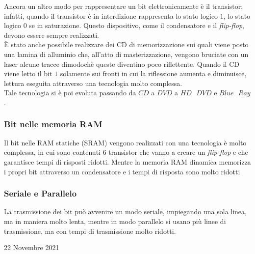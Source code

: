 \documentclass[a4paper]{extarticle}
\begin{document}
Ancora un altro modo per rappresentare un bit elettronicamente è il transistor; infatti, quando il transistor è in interdizione rappresenta lo stato logico \(1\), lo stato logico \(0\) se in saturazione. Questo dispositivo, come il condensatore e il \textit{flip-flop}, devono essere sempre realizzati.\\
È stato anche possibile realizzare dei CD di memorizzazione sui quali viene posto una lamina di alluminio che, all'atto di masterizzazione, vengono bruciate con un laser alcune tracce dimodochè queste diventino poco riflettente. Quando il CD viene letto il bit \(1\) solamente sui fronti in cui la riflessione aumenta e diminuisce, lettura eseguita attraverso una tecnologia molto complessa.\\
Tale tecnologia si è poi evoluta passando da \(CD\) a \(DVD\) a \(HD \textbf{ } DVD\) e \(Blue \textbf{ } Ray\).

\subsubsection{Bit nelle memoria RAM}
Il bit nelle RAM statiche (SRAM) vengono realizzati con una tecnologia è molto complessa, in cui sono contenuti \(6\) transistor che vanno a creare un \textit{flip-flop} e che garantisce tempi di risposti ridotti. Mentre la memoria RAM dinamica memorizza i propri bit attraverso un condensatore e i tempi di risposta sono molto ridotti

\subsubsection{Seriale e Parallelo}
La trasmissione dei bit può avvenire un modo seriale, impiegando una sola linea, ma in maniera molto lenta, mentre in modo parallelo si usano più linee di trasmissione, ma con tempi di trasmissione molto ridotti.

\newpage
\begin{center}
    22 Novembre 2021
\end{center}
\end{document}
